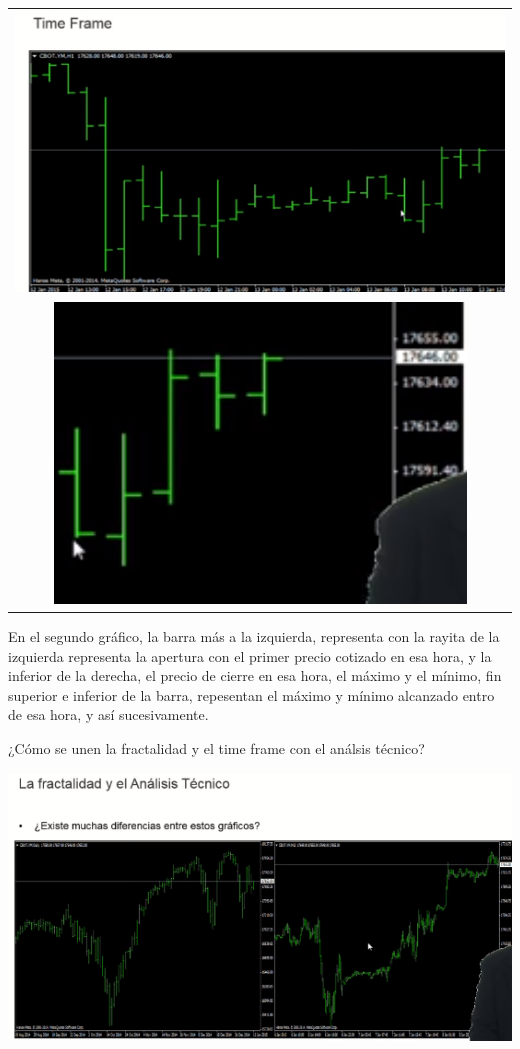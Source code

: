 \begin{center}
    \begin{tabular}{ c }
        \includegraphics[scale=.80]{images/time-frame.png}
        \\
        \includegraphics[scale=.80]{images/time-frame-01.png}
    \end{tabular}
\end{center}
En el segundo gráfico, la barra más a la izquierda, representa con la rayita de la izquierda representa la apertura con el primer precio cotizado en esa hora, y la inferior de la derecha, el precio de cierre en esa hora, el máximo y el mínimo, fin superior e inferior de la barra, repesentan el máximo y mínimo alcanzado entro de esa hora, y así sucesivamente.

¿Cómo se unen la fractalidad y el time frame con el análsis técnico?
\begin{center}
    \includegraphics[scale=.80]{images/time-frame-02.png}
\end{center}

